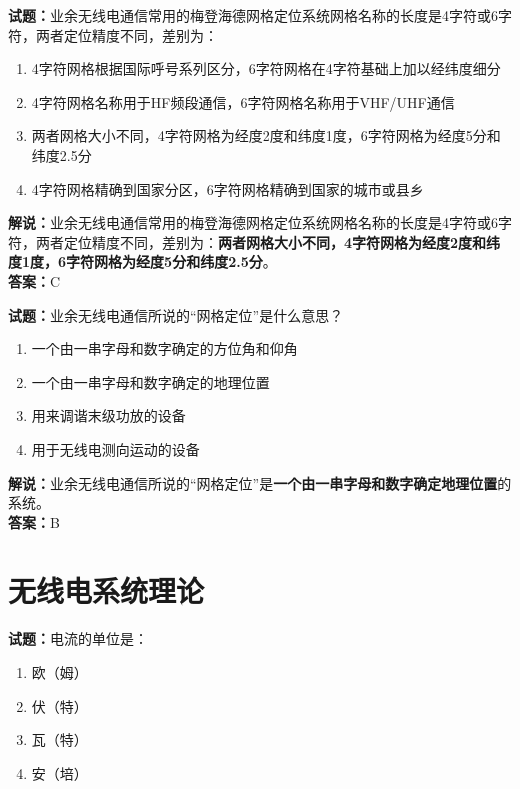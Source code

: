 \documentclass{ctexbook}
\begin{document}
\noindent\textbf{试题：}业余无线电通信常用的梅登海德网格定位系统网格名称的长度是4字符或6字符，两者定位精度不同，差别为：

\begin{enumerate}[leftmargin=3em]
	\item 4字符网格根据国际呼号系列区分，6字符网格在4字符基础上加以经纬度细分
	\item 4字符网格名称用于HF频段通信，6字符网格名称用于VHF/UHF通信
	\item 两者网格大小不同，4字符网格为经度2度和纬度1度，6字符网格为经度5分和纬度2.5分
	\item 4字符网格精确到国家分区，6字符网格精确到国家的城市或县乡
\end{enumerate}

\noindent\textbf{解说：}业余无线电通信常用的梅登海德网格定位系统网格名称的长度是4字符或6字符，两者定位精度不同，差别为：\textbf{两者网格大小不同，4字符网格为经度2度和纬度1度，6字符网格为经度5分和纬度2.5分}。\\\noindent\textbf{答案：}C

\bigskip


\noindent\textbf{试题：}业余无线电通信所说的“网格定位”是什么意思？

\begin{enumerate}[leftmargin=3em]
	\item 一个由一串字母和数字确定的方位角和仰角
	\item 一个由一串字母和数字确定的地理位置
	\item 用来调谐末级功放的设备
	\item 用于无线电测向运动的设备
\end{enumerate}

\noindent\textbf{解说：}业余无线电通信所说的“网格定位”是\textbf{一个由一串字母和数字确定地理位置}的系统。\\\noindent\textbf{答案：}B









\chapter{无线电系统理论}

\newpage


\noindent\textbf{试题：}电流的单位是：

\begin{enumerate}[leftmargin=3em]
	\item 欧（姆）
	\item 伏（特）
	\item 瓦（特）
	\item 安（培）
\end{enumerate}
\end{document}
